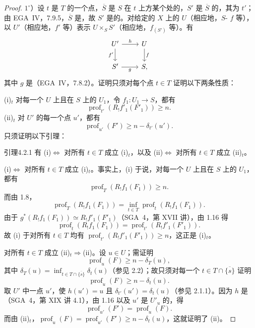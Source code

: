 \begin{proof}
$1^\circ$）设 $t$ 是 $T$ 的一个点，$\overline S$ 是 $S$ 在 $t$ 上方某个处的，$S'$ 是 $\overline S$ 的，其为 $t'$；由 EGA~IV，7.9.5，$\overline S$ 是，故 $S'$ 是的。对给定的 $X$ 上的 $U$（相应地，$S$- $f$ 等），以 $U'$（相应地，$f'$ 等）表示 $U\times_SS'$（相应地，$f_{(S')}$ 等）。有
\[
\begin{tikzcd}
U'\arrow[r,"h"]\arrow[d,"f'"']&U\arrow[d,"f"]\\
S'\arrow[r,"g"']&S,
\end{tikzcd}
\]
其中 $g$ 是（EGA~IV，7.8.2）。证明只须对每个点 $t\in T$ 证明以下两条性质：

(i)$_t$ 对每一个 $U$ 上且在 $S$ 上的 $U_1$，令 $f_1:U_1\to S$，都有
\[
\operatorname{prof}_{t'}(R_!f'_1(F'_1))\geq n.
\]
(ii)$_t$ 对 $U'$ 的每一个点 $u'$，都有
\[
\operatorname{prof}_{u'}(F')\geq n-\delta_{t'}(u').
\]
只须证明以下引理：
\begin{SGAresult}{引理}{4.2.1}
有 (i)$\Leftrightarrow$ 对所有 $t\in T$ 成立 (i)$_t$，以及 (ii)$\Leftrightarrow$ 对所有 $t\in T$ 成立 (ii)$_t$。
\end{SGAresult}
(i)$\Leftrightarrow$ 对所有 $t\in T$ 成立 (i)$_t$。事实上，(i) 于说，对每一个 $U$ 上且在 $S$ 上的 $U_1$，都有
\[
\operatorname{prof}_T(R_!f_1(F_1))\geq n.
\]
而由 1.8，
\[
\operatorname{prof}_T(R_!f_1(F_1))=
\inf_{t\in T}\operatorname{prof}_t(R_!f_1(F_1)).
\]
由于 $g^*(R_!f_1(F_1))\simeq R_!f'_1(F'_1)$（SGA~4，第 XVII 讲），由 1.16 得
\[
\operatorname{prof}_t(R_!f_1(F_1))=
\operatorname{prof}_{t'}(R_!f'_1(F'_1)).
\]
故 (i) 于对所有 $t\in T$ 均有 $\operatorname{prof}_{t'}(R_!f'_1(F'_1))\geq n$，这正是 (i)$_t$。

对所有 $t\in T$ 成立 (ii)$_t\Rightarrow$(ii)。设 $u\in U$；需证明
\[
\operatorname{prof}_u(F)\geq n-\delta_T(u),
\]
其中 $\delta_T(u)=\inf_{t\in T\cap\overline{\{s\}}}\delta_t(u)$（参见 2.2）；故只须对每一个 $t\in T\cap\overline{\{s\}}$ 证明
\[
\operatorname{prof}_u(F)\geq n-\delta_t(u).
\]
取 $U'$ 中一点 $u'$，使 $h(u')=u$ 且 $\delta_{t'}(u')=\delta_t(u)$（参见 2.1.1）。因为 $h$ 是（SGA~4，第 XIX 讲 4.1），由 1.16 以及 $u'$ 是 $U'_u$ 的，得
\[
\operatorname{prof}_{u'}(F')=\operatorname{prof}_u(F).
\]
而由 (ii)$_t$，$\operatorname{prof}_u(F)=\operatorname{prof}_{u'}(F')\geq n-\delta_t(u)$，这就证明了 (ii)。


\end{proof}
